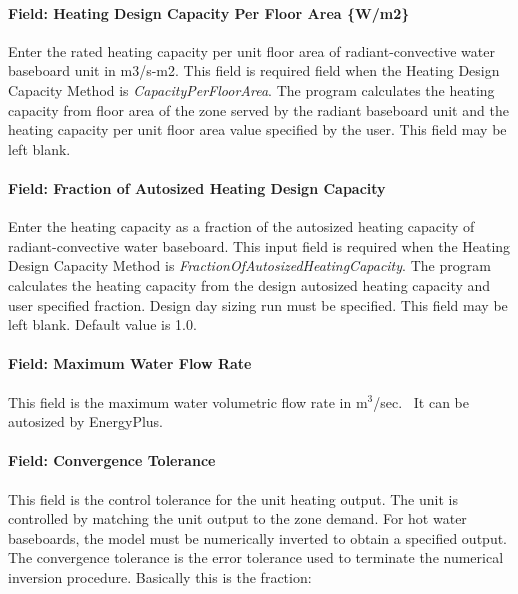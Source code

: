 \paragraph{Field: Heating Design Capacity Per Floor Area \{W/m2\}}\label{field-heating-design-capacity-per-floor-area-wm2-000}

Enter the rated heating capacity per unit floor area of radiant-convective water baseboard unit in m3/s-m2. This field is required field when the Heating Design Capacity Method is \emph{CapacityPerFloorArea}. The program calculates the heating capacity from floor area of the zone served by the radiant baseboard unit and the heating capacity per unit floor area value specified by the user. This field may be left blank.

\paragraph{Field: Fraction of Autosized Heating Design Capacity}\label{field-fraction-of-autosized-heating-design-capacity-000}

Enter the heating capacity as a fraction of the autosized heating capacity of radiant-convective water baseboard. This input field is required when the Heating Design Capacity Method is \emph{FractionOfAutosizedHeatingCapacity}. The program calculates the heating capacity from the design autosized heating capacity and user specified fraction. Design day sizing run must be specified. This field may be left blank. Default value is 1.0.

\paragraph{Field: Maximum Water Flow Rate}\label{field-maximum-water-flow-rate-001}

This field is the maximum water volumetric flow rate in m\(^{3}\)/sec.~ It can be autosized by EnergyPlus.

\paragraph{Field: Convergence Tolerance}\label{field-convergence-tolerance-000}

This field is the control tolerance for the unit heating output. The unit is controlled by matching the unit output to the zone demand. For hot water baseboards, the model must be numerically inverted to obtain a specified output. The convergence tolerance is the error tolerance used to terminate the numerical inversion procedure. Basically this is the fraction:

